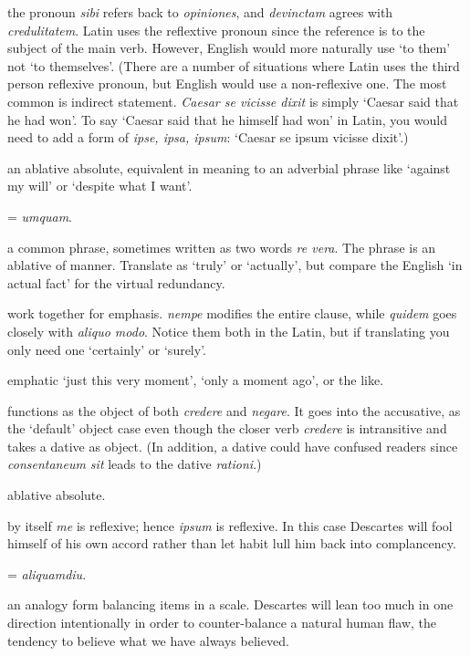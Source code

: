  the pronoun \textit{sibi} refers back to \textit{opiniones}, and \textit{devinctam} agrees with \textit{credulitatem}. Latin uses the reflextive pronoun since the reference is to the subject of the main verb. However, English would more naturally use `to them' not `to themselves'. (There are a number of situations where Latin uses the third person reflexive pronoun, but English would use a non-reflexive one. The most common is indirect statement. \textit{Caesar se vicisse dixit} is simply `Caesar said that he had won'. To say `Caesar said that he himself had won' in Latin, you would need to add a form of \textit{ipse, ipsa, ipsum}: `Caesar se ipsum vicisse dixit'.)

 an ablative absolute, equivalent in meaning to an adverbial phrase like `against my will' or `despite what I want'.

 = \textit{umquam}.

 a common phrase, sometimes written as two words \textit{re vera}. The phrase is an ablative of manner. Translate as `truly' or `actually', but compare the English `in actual fact' for the virtual redundancy.

 work together for emphasis. \textit{nempe} modifies the entire clause, while \textit{quidem} goes closely with \textit{aliquo modo}. Notice them both in the Latin, but if translating you only need one `certainly' or `surely'.

 emphatic `just this very moment', `only a moment ago', or the like.

 functions as the object of both \textit{credere} and \textit{negare}. It goes into the accusative, as the `default' object case even though the closer verb \textit{credere} is intransitive and takes a dative as object. (In addition, a dative could have confused readers since \textit{consentaneum sit} leads to the dative \textit{rationi}.)

 ablative absolute.

 by itself \textit{me} is reflexive; hence \textit{ipsum} is reflexive. In this case Descartes will fool himself of his own accord rather than let habit lull him back into complancency.

 = \textit{aliquamdiu}. 

 an analogy form balancing items in a scale. Descartes will lean too much in one direction intentionally in order to counter-balance a natural human flaw, the tendency to believe what we have always believed.

